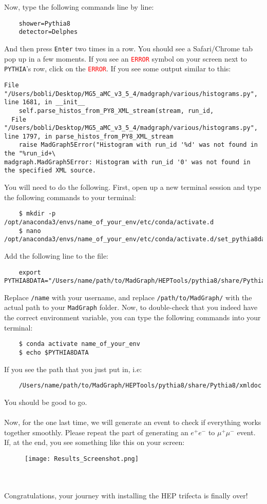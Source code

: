 \documentclass[12pt, english]{article}
\begin{document}
Now, type the following commands line by line:
\begin{lstlisting}
    shower=Pythia8
    detector=Delphes
\end{lstlisting}
And then press \texttt{Enter} two times in a row. You should see a Safari/Chrome tab pop up in a few moments. 
If you see an \textcolor{red}{\texttt{ERROR}} symbol on your screen next to \texttt{PYTHIA}'s row, click on the \textcolor{red}{\texttt{ERROR}}. If you see some output similar to this:
\begin{lstlisting}
File "/Users/bobli/Desktop/MG5_aMC_v3_5_4/madgraph/various/histograms.py", line 1681, in __init__
    self.parse_histos_from_PY8_XML_stream(stream, run_id,
  File "/Users/bobli/Desktop/MG5_aMC_v3_5_4/madgraph/various/histograms.py", line 1797, in parse_histos_from_PY8_XML_stream
    raise MadGraph5Error("Histogram with run_id '%d' was not found in the "%run_id+\
madgraph.MadGraph5Error: Histogram with run_id '0' was not found in the specified XML source.
\end{lstlisting}
You will need to do the following. First, open up a new terminal session and type the following commands to your terminal:
\begin{lstlisting}
    $ mkdir -p /opt/anaconda3/envs/name_of_your_env/etc/conda/activate.d
    $ nano /opt/anaconda3/envs/name_of_your_env/etc/conda/activate.d/set_pythia8data.sh
\end{lstlisting}
Add the following line to the file:
\begin{lstlisting}
    export PYTHIA8DATA="/Users/name/path/to/MadGraph/HEPTools/pythia8/share/Pythia8/xmldoc"
\end{lstlisting}
Replace \texttt{/name} with your username, and replace \texttt{/path/to/MadGraph/} with the actual path to your \texttt{MadGraph} folder.
Now, to double-check that you indeed have the correct environment variable, you can type the following commands into your terminal:
\begin{lstlisting}
    $ conda activate name_of_your_env
    $ echo $PYTHIA8DATA
\end{lstlisting}
If you see the path that you just put in, i.e:
\begin{lstlisting}
    /Users/name/path/to/MadGraph/HEPTools/pythia8/share/Pythia8/xmldoc
\end{lstlisting}
You should be good to go. \\\\
Now, for the one last time, we will generate an event to check if everything works together smoothly. Please repeat the part of generating an $e^+ e^-$ to $\mu^+\mu^-$ event. If, at the end, you see something like this on your screen: 
\begin{figure}[h]
    \centering
    \texttt{[image: Results\_Screenshot.png]}
\end{figure}
\\\\
Congratulations, your journey with installing the HEP trifecta is finally over! 
\end{document}
